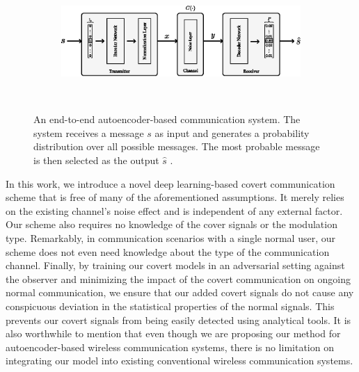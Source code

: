 \begin{figure}[tp!]
	\center
	\begin{subfigure}{0.45\textwidth}
		\includegraphics[width=\linewidth]{figs/original_autoencoder_architecture.eps}
	\end{subfigure}
	\\
	\caption{An end-to-end autoencoder-based communication system. The system receives a message \(s\) as input and generates a probability distribution over all possible messages. The most probable message is then selected as the output \(\hat{s}\) \cite{o2017introduction}.}	
	\label{fig:original_autoencoder_architecture}
\end{figure}

In this work, we introduce a novel deep learning-based covert communication scheme that is free of many of the aforementioned assumptions. It merely relies on the existing channel's noise effect and is independent of any external factor. Our scheme also requires no knowledge of the cover signals or the modulation type. Remarkably, in communication scenarios with a single normal user, our scheme does not even need knowledge about the type of the communication channel. Finally, by training our covert models in an adversarial setting against the observer and minimizing the impact of the covert communication on ongoing normal communication, we ensure that our added covert signals do not cause any conspicuous deviation in the statistical properties of the normal signals. This prevents our covert signals from being easily detected using analytical tools. It is also worthwhile to mention that even though we are proposing our method for autoencoder-based wireless communication systems, there is no limitation on integrating our model into existing conventional wireless communication systems.

